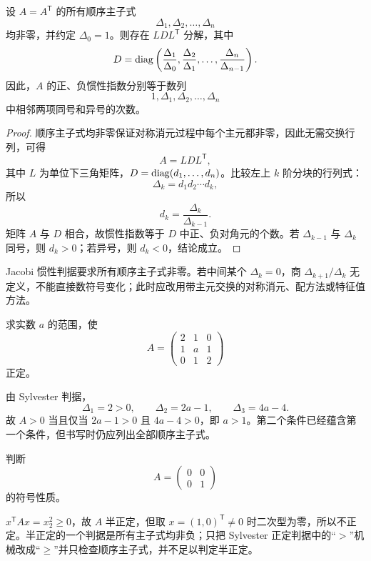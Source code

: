 \begin{theorem}
设 $A=A^{\mathsf T}$ 的所有顺序主子式
\[
\Delta_1,\Delta_2,\ldots,\Delta_n
\]
均非零，并约定 $\Delta_0=1$。则存在 $LDL^{\mathsf T}$ 分解，其中
\[
D=\operatorname{diag}\left(
\frac{\Delta_1}{\Delta_0},
\frac{\Delta_2}{\Delta_1},
\ldots,
\frac{\Delta_n}{\Delta_{n-1}}
\right).
\]
因此，$A$ 的正、负惯性指数分别等于数列
\[
1,\Delta_1,\Delta_2,\ldots,\Delta_n
\]
中相邻两项同号和异号的次数。
\end{theorem}
\begin{proof}
顺序主子式均非零保证对称消元过程中每个主元都非零，因此无需交换行列，可得
\[
A=LDL^{\mathsf T},
\]
其中 $L$ 为单位下三角矩阵，$D=\operatorname{diag}(d_1,\ldots,d_n)$。比较左上 $k$ 阶分块的行列式：
\[
\Delta_k=d_1d_2\cdots d_k,
\]
所以
\[
d_k=\frac{\Delta_k}{\Delta_{k-1}}.
\]
矩阵 $A$ 与 $D$ 相合，故惯性指数等于 $D$ 中正、负对角元的个数。若 $\Delta_{k-1}$ 与 $\Delta_k$ 同号，则 $d_k>0$；若异号，则 $d_k<0$，结论成立。
\end{proof}

\begin{remark}
Jacobi 惯性判据要求所有顺序主子式非零。若中间某个 $\Delta_k=0$，商 $\Delta_{k+1}/\Delta_k$ 无定义，不能直接数符号变化；此时应改用带主元交换的对称消元、配方法或特征值方法。
\end{remark}

\begin{example}[title={含参数矩阵的正定范围}]
求实数 $a$ 的范围，使
\[
A=\begin{pmatrix}
2&1&0\\
1&a&1\\
0&1&2
\end{pmatrix}
\]
正定。
\begin{solution}
由 Sylvester 判据，
\[
\Delta_1=2>0,\qquad \Delta_2=2a-1,\qquad \Delta_3=4a-4.
\]
故 $A>0$ 当且仅当 $2a-1>0$ 且 $4a-4>0$，即 $a>1$。第二个条件已经蕴含第一个条件，但书写时仍应列出全部顺序主子式。
\end{solution}
\end{example}

\begin{example}[title={判断半正定不能只看顺序主子式严格不等式}]
判断
\[
A=\begin{pmatrix}0&0\\0&1\end{pmatrix}
\]
的符号性质。
\begin{solution}
$x^{\mathsf T}Ax=x_2^2\ge0$，故 $A$ 半正定，但取 $x=(1,0)^{\mathsf T}\ne0$ 时二次型为零，所以不正定。半正定的一个判据是所有主子式均非负；只把 Sylvester 正定判据中的“$>$”机械改成“$\ge$”并只检查顺序主子式，并不足以判定半正定。
\end{solution}
\end{example}

